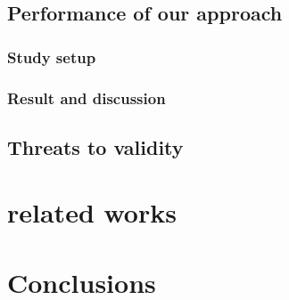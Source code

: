 \documentclass{sig-alternate}
\begin{document}
\subsection{Performance of our approach}


\subsubsection{Study setup}



\subsubsection{Result and discussion}


\subsection{Threats to validity}


\section{related works}


\section{Conclusions}




%

%
%
%
\end{document}
